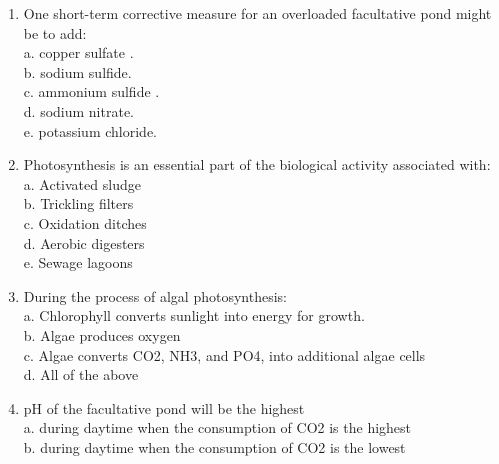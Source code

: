 \begin{tcolorbox}[breakable, enhanced,
colframe=blue!25,
colback=blue!10,
coltitle=blue!20!black,  
title= Chapter Assessment]
\begin{enumerate}
\item  One short-term corrective measure for an overloaded facultative pond might be to add:\\


a. copper sulfate . \\

b. sodium sulfide. \\

c. ammonium sulfide . \\

d. sodium nitrate. \\

e. potassium chloride. \\


\item  Photosynthesis is an essential part of the biological activity associated with:\\


a. Activated sludge \\

b. Trickling filters \\

c. Oxidation ditches \\

d. Aerobic digesters \\

e. Sewage lagoons \\


\item  During the process of algal photosynthesis:\\


a. Chlorophyll converts sunlight into energy for growth. \\

b. Algae produces oxygen \\

c. Algae converts CO2, NH3, and PO4, into additional algae cells \\

d. All of the above \\


\item  pH of the facultative pond will be the highest\\


a. during daytime when the consumption of CO2 is the highest \\

b. during daytime when the consumption of CO2 is the lowest \\


\end{enumerate}
\end{tcolorbox}
